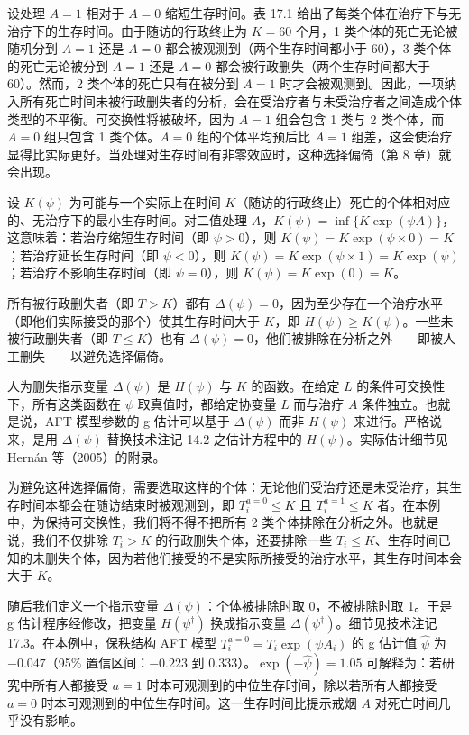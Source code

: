 设处理 $A=1$ 相对于 $A=0$ 缩短生存时间。表 17.1 给出了每类个体在治疗下与无治疗下的生存时间。由于随访的行政终止为 $K=60$ 个月，1 类个体的死亡无论被随机分到 $A=1$ 还是 $A=0$ 都会被观测到（两个生存时间都小于 60），3 类个体的死亡无论被分到 $A=1$ 还是 $A=0$ 都会被行政删失（两个生存时间都大于 60）。然而，2 类个体的死亡只有在被分到 $A=1$ 时才会被观测到。因此，一项纳入所有死亡时间未被行政删失者的分析，会在受治疗者与未受治疗者之间造成个体类型的不平衡。可交换性将被破坏，因为 $A=1$ 组会包含 1 类与 2 类个体，而 $A=0$ 组只包含 1 类个体。$A=0$ 组的个体平均预后比 $A=1$ 组差，这会使治疗显得比实际更好。当处理对生存时间有非零效应时，这种选择偏倚（第 8 章）就会出现。

\begin{techpoint}[人为删失]
设 $K(\psi)$ 为可能与一个实际上在时间 $K$（随访的行政终止）死亡的个体相对应的、无治疗下的最小生存时间。对二值处理 $A$，$K(\psi)=\inf\{K\exp(\psi A)\}$，这意味着：若治疗缩短生存时间（即 $\psi>0$），则 $K(\psi)=K\exp(\psi\times0)=K$；若治疗延长生存时间（即 $\psi<0$），则 $K(\psi)=K\exp(\psi\times1)=K\exp(\psi)$；若治疗不影响生存时间（即 $\psi=0$），则 $K(\psi)=K\exp(0)=K$。

所有被行政删失者（即 $T>K$）都有 $\Delta(\psi)=0$，因为至少存在一个治疗水平（即他们实际接受的那个）使其生存时间大于 $K$，即 $H(\psi)\ge K(\psi)$。一些未被行政删失者（即 $T\le K$）也有 $\Delta(\psi)=0$，他们被排除在分析之外——即被人工删失——以避免选择偏倚。

人为删失指示变量 $\Delta(\psi)$ 是 $H(\psi)$ 与 $K$ 的函数。在给定 $L$ 的条件可交换性下，所有这类函数在 $\psi$ 取真值时，都给定协变量 $L$ 而与治疗 $A$ 条件独立。也就是说，AFT 模型参数的 g 估计可以基于 $\Delta(\psi)$ 而非 $H(\psi)$ 来进行。严格说来，是用 $\Delta(\psi)$ 替换技术注记 14.2 之估计方程中的 $H(\psi)$。实际估计细节见 Hernán 等（2005）的附录。
\end{techpoint}

为避免这种选择偏倚，需要选取这样的个体：无论他们受治疗还是未受治疗，其生存时间本都会在随访结束时被观测到，即 $T_i^{a=0}\le K$ 且 $T_i^{a=1}\le K$ 者。在本例中，为保持可交换性，我们将不得不把所有 2 类个体排除在分析之外。也就是说，我们不仅排除 $T_i>K$ 的行政删失个体，还要排除一些 $T_i\le K$、生存时间已知的未删失个体，因为若他们接受的不是实际所接受的治疗水平，其生存时间本会大于 $K$。

随后我们定义一个指示变量 $\Delta(\psi)$：个体被排除时取 0，不被排除时取 1。于是 g 估计程序经修改，把变量 $H(\psi^\dagger)$ 换成指示变量 $\Delta(\psi^\dagger)$。细节见技术注记 17.3。在本例中，保秩结构 AFT 模型 $T_i^{a=0}=T_i\exp(\psi A_i)$ 的 g 估计值 $\hat\psi$ 为 $-0.047$（95\% 置信区间：$-0.223$ 到 $0.333$）。$\exp(-\hat\psi)=1.05$ 可解释为：若研究中所有人都接受 $a=1$ 时本可观测到的中位生存时间，除以若所有人都接受 $a=0$ 时本可观测到的中位生存时间。这一生存时间比提示戒烟 $A$ 对死亡时间几乎没有影响。

